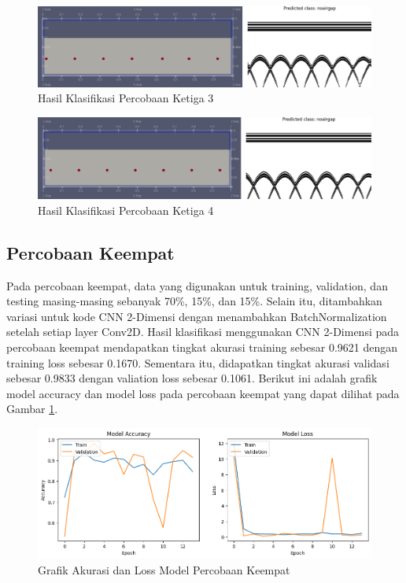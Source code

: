 \begin{figure} [H] \centering
    \includegraphics[scale=0.2]{gambar/bab4/Noarigap 19003.png}
    \caption{Hasil Klasifikasi Percobaan Ketiga 3}
\end{figure}

\begin{figure} [H] \centering
    \includegraphics[scale=0.2]{gambar/bab4/Noairgap 20003.png}
    \caption{Hasil Klasifikasi Percobaan Ketiga 4}
\end{figure}

\subsection{Percobaan Keempat}
Pada percobaan keempat, data yang digunakan untuk training, validation, dan testing masing-masing sebanyak 70\%, 15\%, dan 15\%. Selain itu, ditambahkan variasi untuk kode CNN 2-Dimensi dengan menambahkan BatchNormalization setelah setiap layer Conv2D. Hasil klasifikasi menggunakan CNN 2-Dimensi pada percobaan keempat mendapatkan tingkat akurasi training sebesar 0.9621 dengan training loss sebesar 0.1670. Sementara itu, didapatkan tingkat akurasi validasi sebesar 0.9833 dengan valiation loss sebesar 0.1061. Berikut ini adalah grafik model accuracy dan model loss pada percobaan keempat yang dapat dilihat pada Gambar \ref{fig:trainres4}.

\begin{figure} [H] \centering
    \includegraphics[scale=0.5]{gambar/bab4/trainres4.png}
    \caption{Grafik Akurasi dan Loss Model Percobaan Keempat}
    \label{fig:trainres4}
\end{figure}

